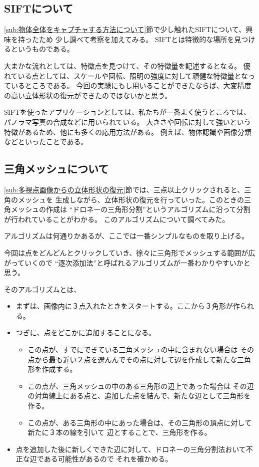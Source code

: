 \documentclass[11pt,a4j]{jsarticle}
\begin{document}
\subsection{SIFTについて}
\label{sub:SIFTについて}

\ref{sub:物体全体をキャプチャする方法について}節で少し触れたSIFTについて、興味を持ったため
少し調べて考察を加えてみる。
SIFTとは特徴的な場所を見つけるというものである。

大まかな流れとしては、特徴点を見つけて、その特徴量を記述するとなる。
優れている点としては、スケールや回転、照明の強度に対して頑健な特徴量となっているところである。
今回の実験にもし用いることができたならば、大変精度の高い立体形状の復元ができたのではないかと思う。


SIFTを使ったアプリケーションとしては、私たちが一番よく使うところでは、
パノラマ写真の合成などに用いられている。
大きさや回転に対して強いという特徴があるため、他にも多くの応用方法がある。
例えば、物体認識や画像分類などといったことである。

\subsection{三角メッシュについて}
\label{sub:三角メッシュについて}
\ref{sub:多視点画像からの立体形状の復元}節では、三点以上クリックされると、三角のメッシュを
生成しながら、立体形状の復元を行っていった。このときの三角メッシュの作成は
``ドロネーの三角形分割''というアルゴリズムに沿って分割が行われていることがわかる。
このアルゴリズムについて調べてみた。

アルゴリズムは何通りかあるが、ここでは一番シンプルなものを取り上げる。

今回は点をどんどんとクリックしていき、徐々に三角形でメッシュする範囲が広がっていくので
``逐次添加法''と呼ばれるアルゴリズムが一番わかりやすいかと思う。

そのアルゴリズムとは、
\begin{itemize}
  \item まずは、画像内に３点入れたときをスタートする。ここから３角形が作られる。
  \item つぎに、点をどこかに追加することになる。
  \begin{itemize}
    \item この点が、すでにできている三角メッシュの中に含まれない場合は
    その点から最も近い２点を選んんでその点に対して辺を作成して新たな三角形を作成する。
    \item この点が、三角メッシュの中のある三角形の辺上であった場合は
    その辺の対角線上にある点と、追加した点を結んで、新たな辺として三角形を作る。
    \item この点が、ある三角形の中にあった場合は、その三角形の頂点に対して新たに３本の線を引いて
    辺とすることで、三角形を作る。
  \end{itemize}
  \item 点を追加した後に新しくできた辺に対して、ドロネーの三角分割法おいて不正な辺である可能性があるので
  それを確かめる。
\end{itemize}
\end{document}

